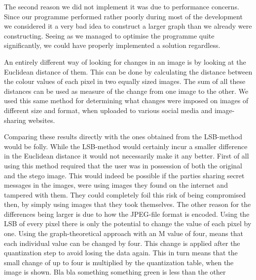 The second reason we did not implement it was due to performance concerns.
Since our programme performed rather poorly during most of the development we considered it a very bad idea to construct a larger graph than we already were constructing.
Seeing as we managed to optimise the programme quite significantly, we could have properly implemented a solution regardless.



An entirely different way of looking for changes in an image is by looking at the Euclidean distance of them.
This can be done by calculating the distance between the colour values of each pixel in two equally sized images.
The sum of all these distances can be used as measure of the change from one image to the other.
We used this same method for determining what changes were imposed on images of different size and format, when uploaded to various social media and image-sharing websites.

Comparing these results directly with the ones obtained from the LSB-method would be folly.
While the LSB-method would certainly incur a smaller difference in the Euclidean distance it would not necessarily make it any better.
First of all using this method required that the user was in possession of both the original and the stego image.
This would indeed be possible if the parties sharing secret messages in the images, were using images they found on the internet and tampered with them.
They could completely foil this risk of being compromised then, by simply using images that they took themselves.
The other reason for the differences being larger is due to how the JPEG-file format is encoded.
Using the LSB of every pixel there is only the potential to change the value of each pixel by one.
Using the graph-theoretical approach with an M value of four, means that each individual value can be changed by four. 
This change is applied after the quantization step to avoid losing the data again.
This in turn means that the small change of up to four is multiplied by the quantization table, when the image is shown.
Bla bla something something green is less than the other